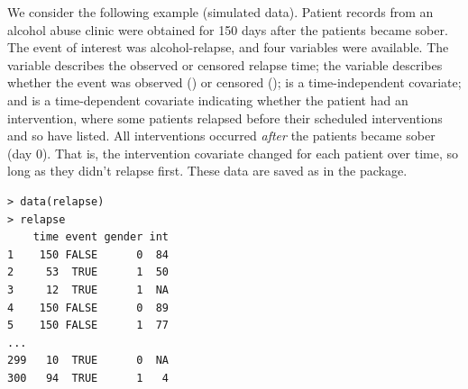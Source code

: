 \documentclass[11pt]{article}
\begin{document}
We consider the following example (simulated data). Patient records from an alcohol abuse clinic were obtained for 150 days after the patients became sober. The event of interest was alcohol-relapse, and four variables were available. The  variable describes the observed or censored relapse time; the  variable describes whether the event was observed () or censored ();  is a time-independent covariate; and  is a time-dependent covariate indicating whether the patient had an intervention, where some patients relapsed before their scheduled interventions and so have  listed. All interventions occurred \emph{after} the patients became sober (day 0). That is, the intervention covariate changed for each patient over time, so long as they didn't relapse first. These data are saved as  in the  package.
{\color{verbatimrcom}\begin{verbatim}
> data(relapse)
> relapse
    time event gender int
1    150 FALSE      0  84
2     53  TRUE      1  50
3     12  TRUE      1  NA
4    150 FALSE      0  89
5    150 FALSE      1  77
...
299   10  TRUE      0  NA
300   94  TRUE      1   4
\end{verbatim}}
\end{document}
